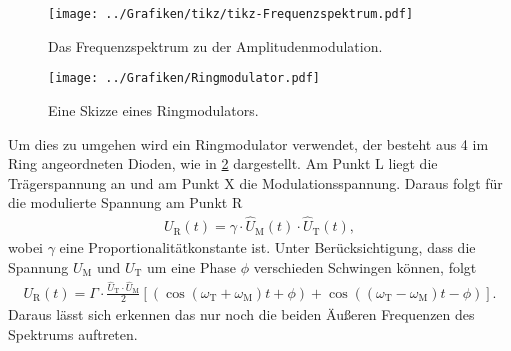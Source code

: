 \begin{figure}
	\centering
	\texttt{[image: ../Grafiken/tikz/tikz-Frequenzspektrum.pdf]}
	\caption{Das Frequenzspektrum zu der Amplitudenmodulation.\label{fig:Frequenzspektrum} }
\end{figure}
\newpage
\begin{figure}
	\centering
	\texttt{[image: ../Grafiken/Ringmodulator.pdf]}
	\caption{Eine Skizze eines Ringmodulators.\cite{V59}\label{fig:Ringmodulator}}
\end{figure}
Um dies zu umgehen wird ein Ringmodulator verwendet, der besteht aus 4 im Ring angeordneten Dioden, wie in \cref{fig:Ringmodulator} dargestellt.
Am Punkt L liegt die Trägerspannung an und am Punkt X die Modulationsspannung.
Daraus folgt für die modulierte Spannung am Punkt R
\begin{align}
	U_\text{R}(t)=\gamma\cdot \hat U_\text{M}(t) \cdot\hat U_\text{T}(t),
\end{align}
wobei $\gamma$ eine Proportionalitätkonstante ist. Unter Berücksichtigung, dass die Spannung $U_\text{M}$ und $U_\text{T}$ um eine Phase $\phi$ verschieden Schwingen können, folgt
\begin{align}
	U_\text{R}(t)=\Gamma\cdot \frac{\hat U_\text{T}\cdot\hat U_\text{M}}{2}\left[ \left(\cos\left(\omega_\text{T}+\omega_\text{M}\right)t+\phi\right) +\cos\left(\left(\omega_\text{T}-\omega_\text{M}\right)t-\phi\right) \right].
\end{align}
Daraus lässt sich erkennen das nur noch die beiden Äußeren Frequenzen des Spektrums auftreten.

\newpage
